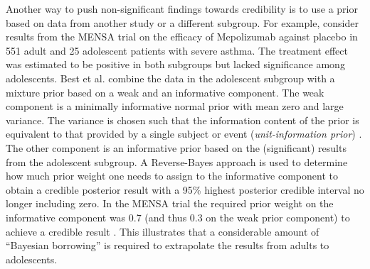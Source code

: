 Another way to push non-significant findings towards credibility is to use a
prior based on data from another study or a different subgroup. For example,
\citet{Best2021} consider results from the MENSA trial \citep{MENSA2014} on the
efficacy of Mepolizumab against placebo in 551 adult and 25 adolescent patients
with severe asthma. The treatment effect was estimated to be positive in both
subgroups but lacked significance among adolescents. Best et al. combine the
data in the adolescent subgroup with a mixture prior based on a weak and an
informative component. The weak component is a minimally informative normal
prior with mean zero and large variance. The variance is chosen such that the
information content of the prior is equivalent to that provided by a single
subject or event (\emph{unit-information prior}) \citep{Kass1995b}. The other
component is an informative prior based on the (significant) results from the
adolescent subgroup. A Reverse-Bayes approach is used to determine how much
prior weight one needs to assign to the informative component to obtain a
credible posterior result with a 95\% highest posterior credible interval no
longer including zero. In the MENSA trial the required prior weight on the
informative component was 0.7 (and thus 0.3 on the weak prior component) to
achieve a credible result \citep{Best2021}. This illustrates that a considerable
amount of ``Bayesian borrowing'' is required to extrapolate the results from
adults to adolescents.


